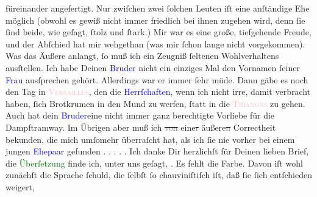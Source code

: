 \documentclass[twoside=false,titlepage=false,open=any, parskip=never, fontsize=12pt, headings=small, chapterprefix=false, appendixprefix=false]{scrbook}
\newcommand{\strikeout}[1]{\sout{#1}}
\newcommand{\dotsfive}{%
.\kern\ellipsisgap 
.\kern\ellipsisgap
.\kern\ellipsisgap
.\kern\ellipsisgap 
.\kern\ellipsisgap 
\relax}
\newcommand{\pbposition}{\depth}
\newcommand{\pb}{\nobreak\hspace{0pt}\raisebox{-0.1em}{\raisebox{\pbposition}{\textnormal{|}}}\nobreak\hspace{0pt}}
\begin{document}
               füreinander angefertigt. Nur zwiſchen zwei ſolchen Leuten iſt eine anſtändige Ehe
               möglich (obwohl es gewiß nicht immer friedlich bei ihnen zugehen wird, denn ſie ſind
               beide, wie geſagt, ſtolz und ſtark.) {\pb}Mir war es
               eine große, tiefgehende Freude, und der Abſchied hat mir wehgethan (was mir ſchon
               lange nicht vorgekommen).\pend
           \pstart
           Was das Äußere anlangt, ſo muß ich ein Zeugniß ſeltenen Wohlverhaltens ausſtellen.
               Ich habe Deinen \textcolor{blue}{Bruder}{} nicht
               ein einziges Mal den Vornamen ſeiner \textcolor{blue}{Frau}{} ausſprechen gehört. Allerdings war er immer ſehr müde. Dann gäbe es
               noch den Tag in \textsc{\textcolor{pink}{Versailles}{}\ledrightnote{\textcolor{pink}{Versailles}}}, den die \textcolor{blue}{Herrſchaften}{}, wenn ich nicht irre, damit verbracht haben,
               ſich Brotkrumen in den Mund zu werfen, ſtatt in die \textsc{\textcolor{pink}{Trianons}{}\ledrightnote{\textcolor{pink}{Petit Trianon}{\newline}\textcolor{pink}{Grand Trianon}}} zu gehen. Auch hat dein \textcolor{blue}{Bruder}{}\ledrightnote{→\textcolor{blue}{Julius Schnitzler}}{ }{\pb}eine nicht immer ganz berechtigte Vorliebe für die
               Dampftramway. Im Übrigen aber muß ich \strikeout{\textcolor{gray}{von}} eine\strikeout{\textcolor{gray}{r}} äußere\strikeout{\textcolor{gray}{n}} Correctheit bekunden, die mich umſomehr überraſcht
               hat, als ich ſie nie vorher bei einem jungen \textcolor{blue}{Ehepaar}{} gefunden{\dotsfive}\pend
           \pstart
           Ich danke Dir herzlichſt für Deinen lieben Brief, die \textcolor{green}{Überſetzung}{} finde ich, unter uns
               geſagt, \label{K_L02608-2v}\label{K_L02608-2h}. Es fehlt die Farbe. Davon iſt wohl zunächſt die
               Sprache ſchuld, die ſelbſt ſo chauviniſtiſch iſt, daß ſie ſich entſchieden weigert,
\end{document}
